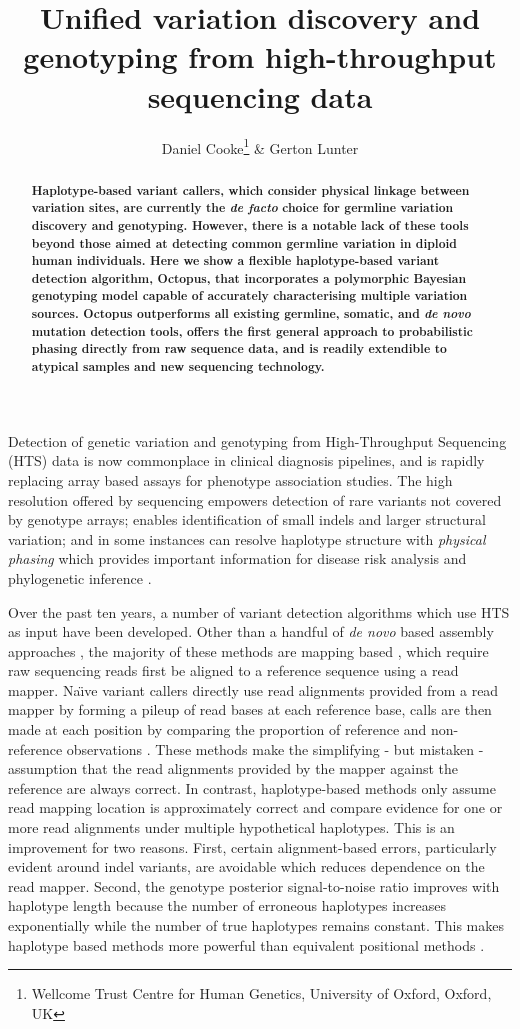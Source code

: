 \documentclass[notitlepage, twocolumn]{article}
\title{Unified variation discovery and genotyping from high-throughput sequencing data}
\author{Daniel Cooke\thanks{Wellcome Trust Centre for Human Genetics, University of Oxford, Oxford, UK} \&
Gerton Lunter\samethanks}
\date{}
\newcommand\invisiblesection[1]{%
  \refstepcounter{section}%
  \addcontentsline{toc}{section}{\protect\numberline{\thesection}#1}%
  \sectionmark{#1}\phantom{}}
\begin{document}
\maketitle
\thispagestyle{empty}

\begin{abstract}\textbf{
Haplotype-based variant callers, which consider physical linkage between variation sites, are currently the \textit{de facto} choice for germline variation discovery and genotyping. However, there is a notable lack of these tools beyond those aimed at detecting common germline variation in diploid human individuals. Here we show a flexible haplotype-based variant detection algorithm, Octopus, that incorporates a polymorphic Bayesian genotyping model capable of accurately characterising multiple variation sources. Octopus outperforms all existing germline, somatic, and \textit{de novo} mutation detection tools, offers the first general approach to probabilistic phasing directly from raw sequence data, and is readily extendible to atypical samples and new sequencing technology.
}\end{abstract}

\invisiblesection{Motivation}

Detection of genetic variation and genotyping from High-Throughput Sequencing (HTS) data is now commonplace in clinical diagnosis pipelines, and is rapidly replacing array based assays for phenotype association studies. The high resolution offered by sequencing empowers detection of rare variants not covered by genotype arrays; enables identification of small indels and larger structural variation; and in some instances can resolve haplotype structure with \emph{physical phasing} which provides important information for disease risk analysis and phylogenetic inference \cite{RN211}.

Over the past ten years, a number of variant detection algorithms which use HTS as input have been developed. Other than a handful of \textit{de novo} based assembly approaches \cite{RN148}, the majority of these methods are mapping based \cite{RN141, RN538, RN5}, which require raw sequencing reads first be aligned to a reference sequence using a read mapper. Na\"\i ve variant callers directly use read alignments provided from a read mapper by forming a pileup of read bases at each reference base, calls are then made at each position by comparing the proportion of reference and non-reference observations \cite{RN537}. These methods make the simplifying - but mistaken - assumption that the read alignments provided by the mapper against the reference are always correct. In contrast, haplotype-based methods only assume read mapping location is approximately correct and compare evidence for one or more read alignments under multiple hypothetical haplotypes. This is an improvement for two reasons. First, certain alignment-based errors, particularly evident around indel variants, are avoidable which reduces dependence on the read mapper. Second, the genotype posterior signal-to-noise ratio improves with haplotype length because the number of erroneous haplotypes increases exponentially while the number of true haplotypes remains constant. This makes haplotype based methods more powerful than equivalent positional methods \cite{RN166}.
\end{document}
